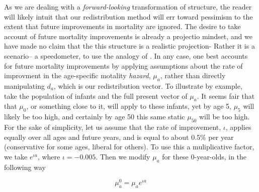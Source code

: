 \FloatBarrier
\label{sec:eximprov}
As we are dealing with a \textit{forward-looking}\citep{sanderson2007new}
transformation of structure, the reader will likely intuit that our redistribution 
method will err toward pessimism to the extent that
future improvements in mortality are ignored. The desire to take account of
future mortality improvements is already a projectio mindset, and we have made
no claim that the this structure is a realistic projection- Rather it is a
scenario-- a speedometer, to use the analogy of \citet{coale1972growth}. In any
case, one best accounts for future mortality improvements by applying assumptions about the rate of
improvment in the age-specific motality \textit{hazard}, $\mu_a$, rather than
directly manipulating $d_a$, which is our redistribution vector. To illustrate by
example, take the population of infants and the full present vector of $\mu_a$. It seems fair that
that $\mu_0$, or something close to it, will apply to these infants, yet by age
5, $\mu_5$ will likely be too high, and certainly by age 50
this same static $\mu_50$ will be too high. For the sake of simplicity, let us assume that the
rate of improvement, $\iota$, applies equally over all ages and future years,
and is equal to about 0.5\% per year (conservative for some ages, liberal
for others). To use this a muliplicative factor, we take $e^{\iota a}$, where
$\iota = -0.005$. Then we modify $\mu_a$ for these 0-year-olds, in the
following way

\begin{equation}
\mu_a^0 = \mu_a e^{\iota a} 
\end{equation}

